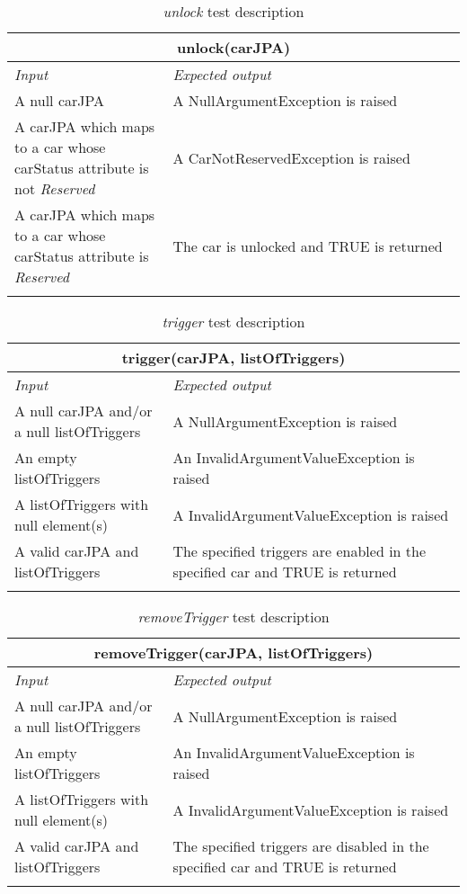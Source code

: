 \begin{longtable}{p{0.35\linewidth}p{0.65\linewidth}}
\multicolumn{2}{c}{\textbf{unlock(carJPA)}} \\
\toprule
\emph{Input} & \emph{Expected output} \\
\midrule
A null carJPA & A NullArgumentException is raised\\
\midrule
A carJPA which maps to a car whose carStatus attribute is not \emph{Reserved} & A CarNotReservedException is raised \\
\midrule
A carJPA which maps to a car whose carStatus attribute is \emph{Reserved} & The car is unlocked and TRUE is returned\\
\bottomrule
\caption{\label{tbl:unlock}\emph{unlock} test description}
\end{longtable}


\begin{longtable}{p{0.35\linewidth}p{0.65\linewidth}}
\multicolumn{2}{c}{\textbf{trigger(carJPA, listOfTriggers)}} \\
\toprule
\emph{Input} & \emph{Expected output} \\
\midrule
A null carJPA and/or a null listOfTriggers & A NullArgumentException is raised\\
\midrule
An empty listOfTriggers & An InvalidArgumentValueException is raised \\
\midrule
A listOfTriggers with null element(s) & A InvalidArgumentValueException is raised\\
\midrule
A valid carJPA and listOfTriggers & The specified triggers are enabled in the specified car and TRUE is returned\\
\bottomrule
\caption{\label{tbl:trigger}\emph{trigger} test description}
\end{longtable}

\clearpage

\begin{longtable}{p{0.35\linewidth}p{0.65\linewidth}}
\multicolumn{2}{c}{\textbf{removeTrigger(carJPA, listOfTriggers)}} \\
\toprule
\emph{Input} & \emph{Expected output} \\
\midrule
A null carJPA and/or a null listOfTriggers & A NullArgumentException is raised\\
\midrule
An empty listOfTriggers & An InvalidArgumentValueException is raised \\
\midrule
A listOfTriggers with null element(s) & A InvalidArgumentValueException is raised\\
\midrule
A valid carJPA and listOfTriggers & The specified triggers are disabled in the specified car and TRUE is returned \\
\bottomrule
\caption{\emph{removeTrigger} test description}
\end{longtable}

